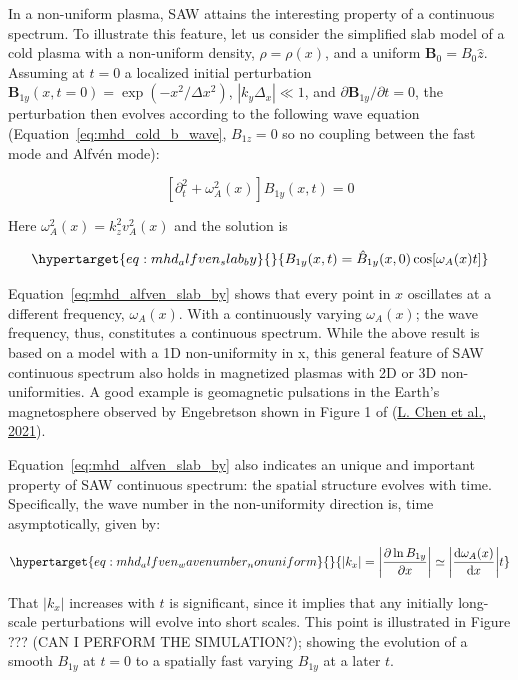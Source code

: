 \documentclass[
  notoc %
]{tufte-book}
\begin{document}
In a non-uniform plasma, SAW attains the interesting property of a
continuous spectrum. To illustrate this feature, let us consider the
simplified slab model of a cold plasma with a non-uniform density,
\(\rho=\rho(x)\), and a uniform \(\mathbf{B}_0 = B_0\hat{z}\). Assuming
at \(t=0\) a localized initial perturbation
\(\mathbf{B}_{1y}(x,t=0) = \exp(-x^2/\Delta x^2)\),
\(|k_y\Delta_x|\ll1\), and \(\partial\mathbf{B}_{1y}/\partial t=0\), the
perturbation then evolves according to the following wave equation
(Equation~\ref{eq:mhd_cold_b_wave}, \(B_{1z}=0\) so no coupling between
the fast mode and Alfvén mode):

\[
[\partial_t^2 + \omega_A^2(x)]B_{1y}(x,t) = 0
\]

Here \(\omega_A^2(x) = k_z^2v_A^2(x)\) and the solution is

\begin{equation}\protect\hypertarget{eq:mhd_alfven_slab_by}{}{
B_{1y}(x,t) = \hat{B}_{1y}(x,0)\cos[\omega_A(x)t]
}\label{eq:mhd_alfven_slab_by}\end{equation}

Equation~\ref{eq:mhd_alfven_slab_by} shows that every point in \(x\)
oscillates at a different frequency, \(\omega_A(x)\). With a
continuously varying \(\omega_A(x)\); the wave frequency, thus,
constitutes a continuous spectrum. While the above result is based on a
model with a 1D non-uniformity in x, this general feature of SAW
continuous spectrum also holds in magnetized plasmas with 2D or 3D
non-uniformities. A good example is geomagnetic pulsations in the
Earth's magnetosphere observed by Engebretson shown in Figure 1 of
(\protect\hyperlink{ref-chen2021physics}{L. Chen et al., 2021}).

Equation~\ref{eq:mhd_alfven_slab_by} also indicates an unique and
important property of SAW continuous spectrum: the spatial structure
evolves with time. Specifically, the wave number in the non-uniformity
direction is, time asymptotically, given by:

\begin{equation}\protect\hypertarget{eq:mhd_alfven_wavenumber_nonuniform}{}{
|k_x| = \bigg\lvert\frac{\partial \ln B_{1y}}{\partial x}\bigg\rvert \simeq \bigg\lvert\frac{\mathrm{d} \omega_A(x)}{\mathrm{d} x}\bigg\rvert t
}\label{eq:mhd_alfven_wavenumber_nonuniform}\end{equation}

That \(|k_x|\) increases with \(t\) is significant, since it implies
that any initially long-scale perturbations will evolve into short
scales. This point is illustrated in Figure ??? (CAN I PERFORM THE
SIMULATION?); showing the evolution of a smooth \(B_{1y}\) at \(t=0\) to
a spatially fast varying \(B_{1y}\) at a later \(t\).
\end{document}
